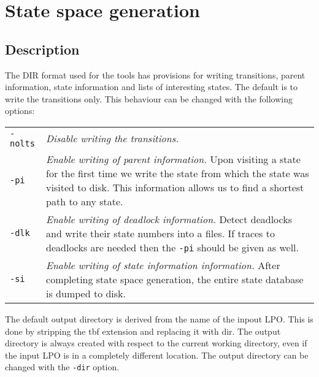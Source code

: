 \documentclass{cwiarticle}
\begin{document}
\section{State space generation}

\subsection*{Description}

The DIR format used for the tools has provisions for writing
transitions, parent information, state information and lists of
interesting states. The default is to write the transitions only.
This behaviour can be changed with the following options:
\\\begin{tabularx}{\textwidth}{lX}
\verb+-nolts+   &  {\em Disable writing the transitions.}
\\
\verb+-pi+  & {\em Enable writing of parent information.} Upon visiting a state for the first time we write the state from which the state was visited to disk. This information allows
us to find a shortest path to any state.
\\
\verb+-dlk+ & {\em Enable writing of deadlock information.} Detect deadlocks and write their state numbers
into a files. If traces to deadlocks are needed then the \verb+-pi+ should be given as well.
\\
\verb+-si+  & {\em Enable writing of state information information.} After completing state space generation, the entire state database is dumped to disk.
\end{tabularx}
The default output directory is derived from the name of the inpout LPO. This is done by stripping
the tbf extension and replacing it with dir. The output directory is always created with respect to the current working directory, even if the input LPO is in a completely different location. The output directory can be changed with the \verb+-dir+ option.

\medskip
\end{document}
